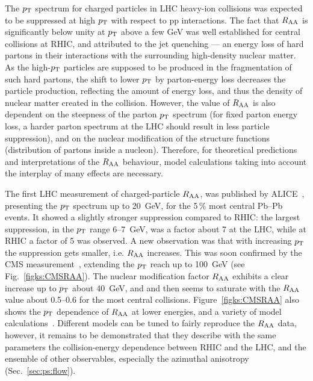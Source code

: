 The $p_{\rm T}$ spectrum for charged particles in LHC heavy-ion collisions was expected to be suppressed at high $p_{\rm T}$ with respect to pp interactions. The fact that $R_{\rm AA}$ is significantly below unity at $p_{\rm T}$ above a few GeV was well established for central collisions at RHIC, and attributed to the jet quenching --- an energy loss of hard partons in their interactions with the surrounding high-density nuclear matter. As the high-$p_{\rm T}$ particles are supposed to be produced in the fragmentation of such hard partons, the shift to lower $p_{\rm T}$  by parton-energy loss decreases the particle production, reflecting the amount of energy loss, and thus the density of nuclear matter created in the collision. However, the value of $R_{\rm AA}$ is also dependent on the steepness of the parton $p_{\rm T}$ spectrum (for fixed parton energy loss, a harder parton spectrum at the LHC should result in less particle suppression), and on the nuclear modification of the structure functions (distribution of partons inside a nucleon). Therefore, for theoretical predictions and interpretations of the $R_{\rm AA}$ behaviour, model calculations taking into account the interplay of many effects are necessary.

The first LHC measurement of charged-particle $R_{\rm AA}$, was published by ALICE~\cite{Aamodt:2010jd}, presenting the $p_{\rm T}$ spectrum up to 20~GeV, for the 5\,\% most central Pb--Pb events. It showed a slightly stronger suppression compared to RHIC: the largest suppression, in the $p_{\rm T}$ range 6--7~GeV, was a factor about 7 at the LHC, while at RHIC a factor of 5 was observed. A new observation was that with increasing $p_{\rm T}$ the suppression gets smaller, i.e. $R_{\rm AA}$ increases. This was soon confirmed by the CMS measurement~\cite{CMS:2012aa}, extending the $p_{\rm T}$ reach up to 100~GeV (see Fig.~\ref{figks:CMSRAA}). The nuclear modification factor $R_{\rm AA}$ exhibits a clear increase up to $p_{\rm T}$ about 40~GeV, and and then seems to saturate with the $R_{\rm AA}$ value about 0.5--0.6 for the most central collisions. Figure~\ref{figks:CMSRAA} also shows the $p_{\rm T}$ dependence of $R_{\rm AA}$ at lower energies, and a variety of model calculations~\cite{Dainese:2004te,Vitev:2002pf,Vitev:2004bh,Salgado:2003gb,Armesto:2005iq,Renk:2011gj}. Different models can be tuned to fairly reproduce the $R_{\rm AA}$ data, however, it remains to be demonstrated that they describe with the same parameters the collision-energy dependence between RHIC and the LHC, and  the ensemble of other observables, especially the azimuthal anisotropy (Sec.~\ref{sec:ps:flow}).

